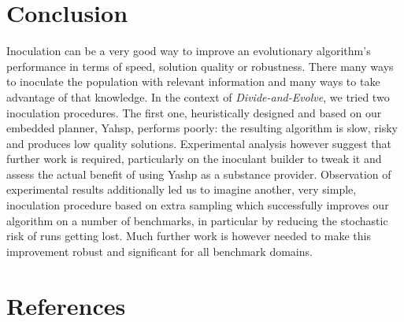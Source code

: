 \documentclass[english]{DESCARWINreport}
\newcommand{\dae}{{\em Divide-and-Evolve}}
\begin{document}
\newpage
\chapter{Conclusion}

Inoculation can be a very good way to improve an evolutionary algorithm's performance in terms of speed, solution quality or robustness. There many ways to inoculate the population with relevant information and many ways to take advantage of that knowledge. In the context of \dae, we tried two inoculation procedures. The first one, heuristically designed and based on our embedded planner, Yahsp, performs poorly: the resulting algorithm is slow, risky and produces low quality solutions. Experimental analysis however suggest that further work is required, particularly on the inoculant builder to tweak it and assess the actual benefit of using Yashp as a substance provider. Observation of experimental results additionally led us to imagine another, very simple, inoculation procedure based on extra sampling which successfully improves our algorithm on a number of benchmarks, in particular by reducing the stochastic risk of runs getting lost. Much further work is however needed to make this improvement robust and significant for all benchmark domains.

\newpage
\newpage
\chapter{References}





%
%
%
\end{document}
